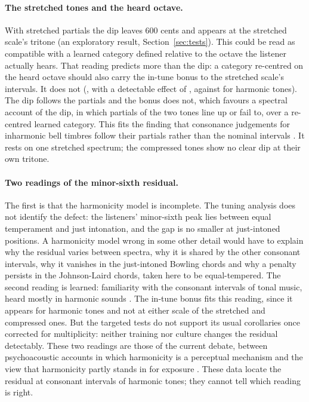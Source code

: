 \documentclass[11pt,a4paper]{article}
\begin{document}
\paragraph{The stretched tones and the heard octave.}
With stretched partials the dip leaves 600 cents and appears at the stretched scale's tritone (an exploratory result, Section~\ref{sec:tests}).
This could be read as compatible with a learned category defined
relative to the octave the listener actually hears. That reading predicts more than the dip:
a category re-centred on the heard octave should also carry the in-tune bonus to the
stretched scale's intervals. It does not (\sbOwnStr, with a detectable effect of
\sbMdeStr, against \sbOwnHarm{} for harmonic tones). The dip follows the partials and the bonus
does not, which favours a spectral account of the dip, in which partials of the two tones
line up or fail to, over a re-centred learned category. This fits the finding that
consonance judgements for inharmonic bell timbres follow their partials rather than the
nominal intervals \citep{harrison2024carillon}. It rests on one stretched spectrum; the
compressed tones show no clear dip at their own tritone.

\paragraph{Two readings of the minor-sixth residual.}
The first is that the harmonicity model is incomplete. The tuning analysis does not identify
the defect: the listeners' minor-sixth peak lies between equal temperament and just
intonation, and the gap is no smaller at just-intoned positions. A harmonicity model wrong in
some other detail would have to explain why the residual varies between spectra, why it is
shared by the other consonant intervals, why it vanishes in the just-intoned Bowling chords
and why a penalty persists in the Johnson-Laird chords, taken here to be equal-tempered. The second reading is
learned: familiarity with the consonant intervals of tonal music, heard mostly in harmonic
sounds \citep{lahdelma2022,mcdermott2016}. The in-tune bonus fits this reading, since it
appears for harmonic tones and not at either scale of the stretched and compressed ones. But
the targeted tests do not support its usual corollaries once corrected for multiplicity:
neither training \citep[compare][]{mcdermott2010,popescu2019} nor culture
changes the residual detectably. These two readings are those of the current debate, between
psychoacoustic accounts in which harmonicity is a perceptual mechanism
\citep{harrison2020,marjieh2024} and the view that harmonicity partly stands in for exposure
\citep{lahdelma2022,milne2023}. These data locate the residual at consonant intervals of harmonic
tones; they cannot tell which reading is right.
\end{document}
